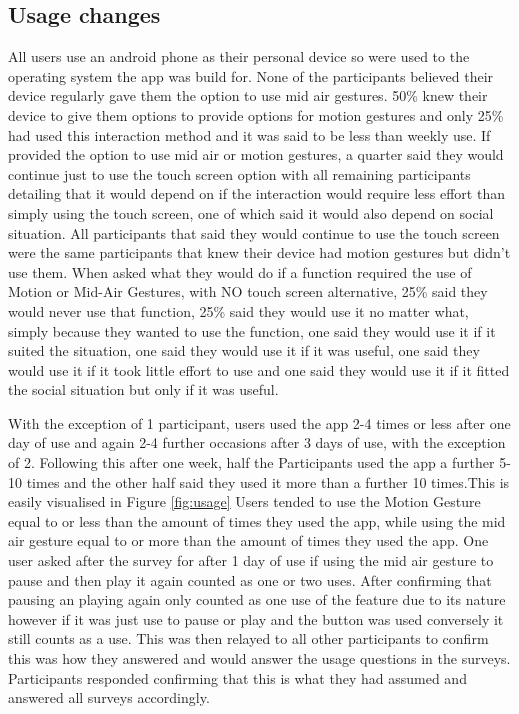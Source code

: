 \documentclass{l4proj}
\begin{document}
\subsection{Usage changes}
All users use an android phone as their personal device so were used to the operating system the app was build for. None of the participants believed their device regularly gave them the option to use mid air gestures. 50\% knew their device to give them options to provide options for motion gestures and only 25\% had used this interaction method and it was said to be less than weekly use. If provided the option to use mid air or motion gestures, a quarter said they would continue just to use the touch screen option with all remaining participants detailing that it would depend on if the interaction would require less effort than simply using the touch screen, one of which said it would also depend on social situation. All participants that said they would continue to use the touch screen were the same participants that knew their device had motion gestures but didn't use them. When asked what they would do if a function required the use of Motion or Mid-Air Gestures, with NO touch screen alternative, 25\% said they would never use that function, 25\% said they would use it no matter what, simply because they wanted to use the function, one said they would use it if it suited the situation, one said they would use it if it was useful, one said they would use it if it took little effort to use and one said they would use it if it fitted the social situation but only if it was useful.

With the exception of 1 participant, users  used the app 2-4 times or less after one day of use and again 2-4 further occasions after 3 days of use, with the exception of 2. Following this after one week, half the Participants used the app a further 5-10 times and the other half said they used it more than a further 10 times.This is easily visualised in Figure \ref{fig:usage} Users tended to use the Motion Gesture equal to or less than the amount of times they used the app, while using the mid air gesture equal to or more than the amount of times they used the app. One user asked after the survey for after 1 day of use if using the mid air gesture to pause and then play it again counted as one or two uses. After confirming that pausing an playing again only counted as one use of the feature due to its nature however if it was just use to pause or play and the button was used conversely it still counts as a use. This was then relayed to all other participants to confirm this was how they answered and would answer the usage questions in the surveys. Participants responded confirming that this is what they had assumed and answered all surveys accordingly.
\end{document}
